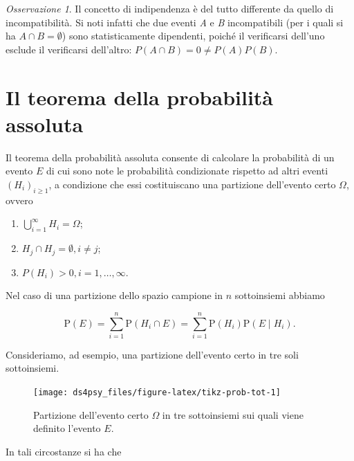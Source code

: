 \documentclass[
  11pt,
]{krantz}
\providecommand{\tightlist}{%
  \setlength{\itemsep}{0pt}\setlength{\parskip}{0pt}}
\theoremstyle{definition}
\theoremstyle{definition}
\theoremstyle{definition}
\theoremstyle{definition}
\theoremstyle{remark}
\newtheorem*{remark}{Osservazione}
\begin{document}
\begin{remark}
Il concetto di indipendenza è del tutto differente da quello di incompatibilità. Si noti infatti che due eventi \emph{A} e \emph{B} incompatibili (per i quali si ha \(A \cap B = \emptyset\)) sono statisticamente dipendenti, poiché il verificarsi dell'uno esclude il verificarsi dell'altro: \(P(A \cap B)=0 \neq P(A)P(B)\).
\end{remark}

\hypertarget{il-teorema-della-probabilituxe0-assoluta}{%
\section{Il teorema della probabilità assoluta}\label{il-teorema-della-probabilituxe0-assoluta}}

Il teorema della probabilità assoluta consente di calcolare la probabilità di un evento \(E\) di cui sono note le probabilità condizionate rispetto ad altri eventi \((H_i)_{i\geq 1}\), a condizione che essi costituiscano una partizione dell'evento certo \(\Omega\), ovvero

\begin{enumerate}
\def\labelenumi{\arabic{enumi}.}
\tightlist
\item
  \(\bigcup_{i=1}^\infty H_i = \Omega\);
\item
  \(H_j \cap H_j = \emptyset, i\neq j\);
\item
  \(P(H_i) > 0, i = 1, \dots, \infty\).
\end{enumerate}

Nel caso di una partizione dello spazio campione in \(n\) sottoinsiemi abbiamo

\begin{equation}
{\mbox{P}}(E)=\sum _{{i=1}}^{n}{\mbox{P}}(H_{i}\cap E)=\sum _{{i=1}}^{n}{\mbox{P}}(H_{i}){\mbox{P}}(E \mid H_{i}).
\end{equation}

Consideriamo, ad esempio, una partizione dell'evento certo in tre soli sottoinsiemi.

\begin{figure}

{\centering \texttt{[image: ds4psy\_files/figure-latex/tikz-prob-tot-1]} 

}

\caption{Partizione dell'evento certo $\Omega$ in tre sottoinsiemi sui quali viene definito l'evento $E$.}\label{fig:tikz-prob-tot}
\end{figure}

In tali circostanze si ha che
\end{document}
